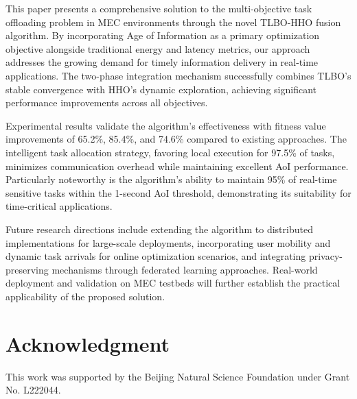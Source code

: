 \documentclass[conference]{IEEEtran}
\begin{document}
This paper presents a comprehensive solution to the multi-objective task offloading problem in MEC environments through the novel TLBO-HHO fusion algorithm. By incorporating Age of Information as a primary optimization objective alongside traditional energy and latency metrics, our approach addresses the growing demand for timely information delivery in real-time applications. The two-phase integration mechanism successfully combines TLBO's stable convergence with HHO's dynamic exploration, achieving significant performance improvements across all objectives.

Experimental results validate the algorithm's effectiveness with fitness value improvements of 65.2\%, 85.4\%, and 74.6\% compared to existing approaches. The intelligent task allocation strategy, favoring local execution for 97.5\% of tasks, minimizes communication overhead while maintaining excellent AoI performance. Particularly noteworthy is the algorithm's ability to maintain 95\% of real-time sensitive tasks within the 1-second AoI threshold, demonstrating its suitability for time-critical applications.

Future research directions include extending the algorithm to distributed implementations for large-scale deployments, incorporating user mobility and dynamic task arrivals for online optimization scenarios, and integrating privacy-preserving mechanisms through federated learning approaches. Real-world deployment and validation on MEC testbeds will further establish the practical applicability of the proposed solution.

\section*{Acknowledgment}

This work was supported by the Beijing Natural Science Foundation under Grant No. L222044.


\end{document}
